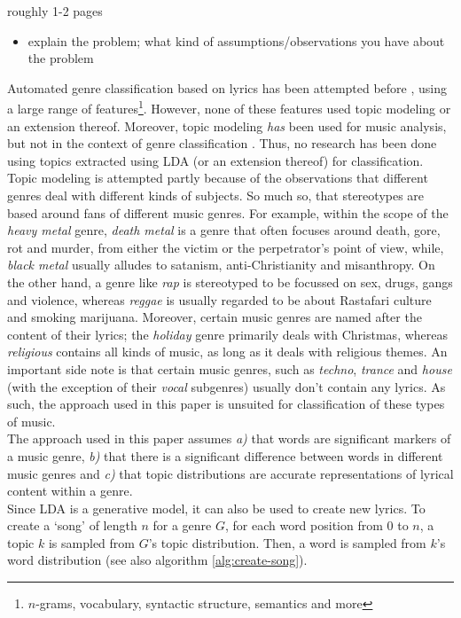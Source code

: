 roughly 1-2 pages
\begin{itemize}
\item explain the problem; what kind of assumptions/observations you have about the problem
\end{itemize}

Automated genre classification based on lyrics has been attempted before \cite{fell lyrics}, using a large range of features\footnote{$n$-grams, vocabulary, syntactic structure, semantics and more}. However, none of these features used topic modeling or an extension thereof. Moreover, topic modeling \textit{has} been used for music analysis, but not in the context of genre classification \cite{lukiccomparison}. Thus, no research has been done using topics extracted using LDA (or an extension thereof) for classification. \\
Topic modeling is attempted partly because of the observations that different genres deal with different kinds of subjects. So much so, that stereotypes are based around fans of different music genres. For example, within the scope of the \textit{heavy metal} genre, \textit{death metal} is a genre that often focuses around death, gore, rot and murder, from either the victim or the perpetrator's point of view, while, \textit{black metal} usually alludes to satanism, anti-Christianity and misanthropy. On the other hand, a genre like \textit{rap} is stereotyped to be focussed on sex, drugs, gangs and violence, whereas \textit{reggae} is usually regarded to be about Rastafari culture and smoking marijuana. Moreover, certain music genres are named after the content of their lyrics; the \textit{holiday} genre primarily deals with Christmas, whereas \textit{religious} contains all kinds of music, as long as it deals with religious themes. An important side note is that certain music genres, such as \textit{techno}, \textit{trance} and \textit{house} (with the exception of their \textit{vocal} subgenres) usually don't contain any lyrics. As such, the approach used in this paper is unsuited for classification of these types of music. \\
The approach used in this paper assumes \textit{a)} that words are significant markers of a music genre, \textit{b)} that there is a significant difference between words in different music genres and \textit{c)} that topic distributions are accurate representations of lyrical content within a genre. \\
Since LDA is a generative model, it can also be used to create new lyrics. To create a `song' of length $n$ for a genre $G$, for each word position from $0$ to $n$, a topic $k$ is sampled from $G$'s topic distribution. Then, a word is sampled from $k$'s word distribution (see also algorithm \ref{alg:create-song}). \\

